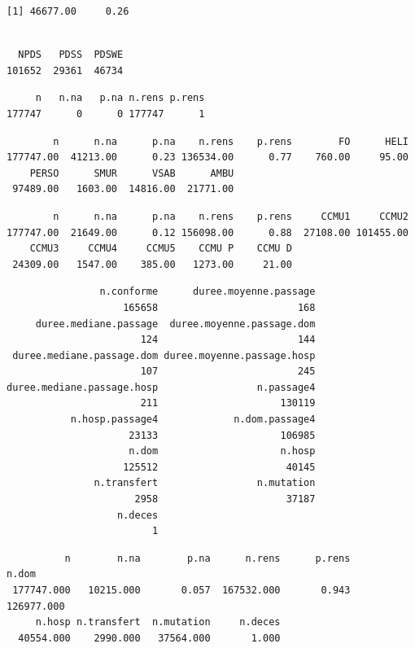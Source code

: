 \documentclass[]{article}
\begin{document}
\begin{verbatim}
[1] 46677.00     0.26
\end{verbatim}

\begin{verbatim}

  NPDS   PDSS  PDSWE 
101652  29361  46734 
\end{verbatim}

\begin{verbatim}
     n   n.na   p.na n.rens p.rens 
177747      0      0 177747      1 
\end{verbatim}

\begin{verbatim}
        n      n.na      p.na    n.rens    p.rens        FO      HELI 
177747.00  41213.00      0.23 136534.00      0.77    760.00     95.00 
    PERSO      SMUR      VSAB      AMBU 
 97489.00   1603.00  14816.00  21771.00 
\end{verbatim}

\begin{verbatim}
        n      n.na      p.na    n.rens    p.rens     CCMU1     CCMU2 
177747.00  21649.00      0.12 156098.00      0.88  27108.00 101455.00 
    CCMU3     CCMU4     CCMU5    CCMU P    CCMU D 
 24309.00   1547.00    385.00   1273.00     21.00 
\end{verbatim}

\begin{verbatim}
                n.conforme      duree.moyenne.passage 
                    165658                        168 
     duree.mediane.passage  duree.moyenne.passage.dom 
                       124                        144 
 duree.mediane.passage.dom duree.moyenne.passage.hosp 
                       107                        245 
duree.mediane.passage.hosp                 n.passage4 
                       211                     130119 
           n.hosp.passage4             n.dom.passage4 
                     23133                     106985 
                     n.dom                     n.hosp 
                    125512                      40145 
               n.transfert                 n.mutation 
                      2958                      37187 
                   n.deces 
                         1 
\end{verbatim}

\begin{verbatim}
          n        n.na        p.na      n.rens      p.rens       n.dom 
 177747.000   10215.000       0.057  167532.000       0.943  126977.000 
     n.hosp n.transfert  n.mutation     n.deces 
  40554.000    2990.000   37564.000       1.000 
\end{verbatim}
\end{document}
